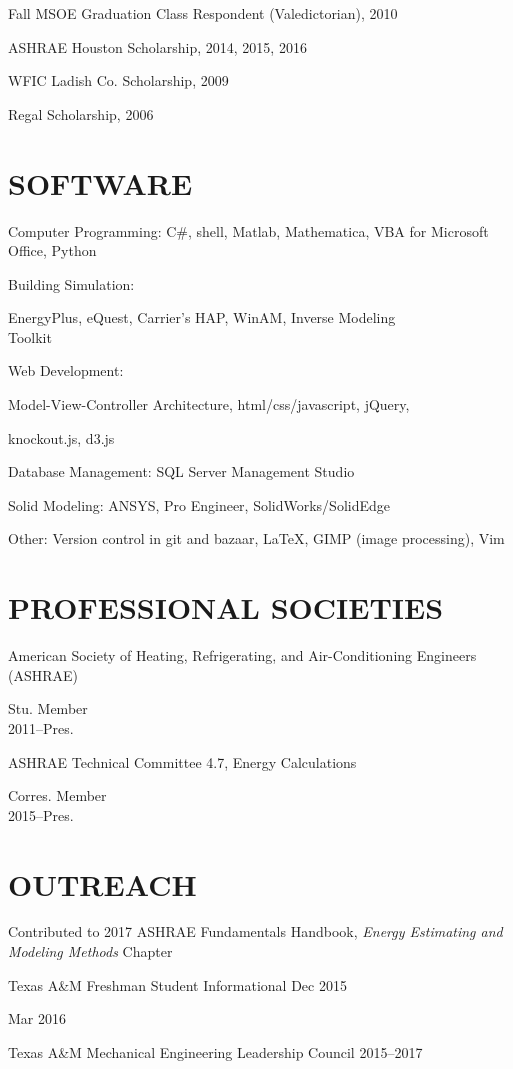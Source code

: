 \documentclass[margin]{res} %
\begin{document}
\begin{resume}
Fall MSOE Graduation Class Respondent (Valedictorian), 2010

ASHRAE Houston Scholarship, 2014, 2015, 2016

WFIC Ladish Co. Scholarship, 2009

Regal Scholarship, 2006

\section{SOFTWARE}

Computer Programming: C\#, shell, Matlab, Mathematica, VBA for Microsoft Office, Python

Building Simulation: \parbox[t]{16cm}{ EnergyPlus, eQuest, Carrier's
HAP, WinAM, Inverse Modeling \\ Toolkit }

Web Development: \parbox[t]{20cm}{Model-View-Controller Architecture,
html/css/javascript, jQuery,\par knockout.js, d3.js}

Database Management: SQL Server Management Studio

Solid Modeling: ANSYS, Pro Engineer, SolidWorks/SolidEdge

Other: Version control in git and bazaar, \LaTeX, GIMP (image processing), Vim

\section{PROFESSIONAL SOCIETIES}

\parbox[t]{9cm}{American Society of Heating, Refrigerating, and Air-Conditioning Engineers (ASHRAE)} \hfill \parbox[t]{3cm}{\raggedleft Stu. Member \\ 2011--Pres.}

\parbox[t]{9cm}{ASHRAE Technical Committee 4.7, Energy Calculations }\hfill \parbox[t]{3cm}{\raggedleft Corres. Member \\ 2015--Pres.}

\section{OUTREACH}
\parbox[t]{10cm}{Contributed to 2017 ASHRAE Fundamentals Handbook, \textit{Energy Estimating and Modeling Methods} Chapter}

Texas A\&M Freshman Student Informational \hfill Dec 2015\\
\strut \hfill Mar 2016

Texas A\&M Mechanical Engineering Leadership Council \hfill 2015--2017



\end{resume}
\end{document}
